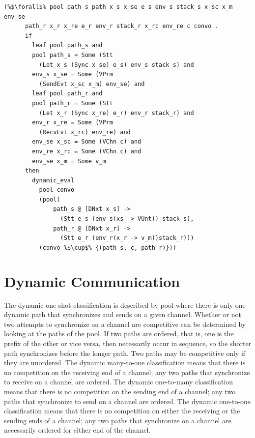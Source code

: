 \documentclass{article}
\begin{document}
\begin{lstlisting}[language=logic, escapechar=\%]
    (%$\forall$% pool path_s path x_s x_se e_s env_s stack_s x_sc x_m env_se
      path_r x_r x_re e_r env_r stack_r x_rc env_re c convo .
      if 
        leaf pool path_s and
        pool path_s = Some (Stt
          (Let x_s (Sync x_se) e_s) env_s stack_s) and
        env_s x_se = Some (VPrm
          (SendEvt x_sc x_m) env_se) and
        leaf pool path_r and
        pool path_r = Some (Stt
          (Let x_r (Sync x_re) e_r) env_r stack_r) and
        env_r x_re = Some (VPrm
          (RecvEvt x_rc) env_re) and
        env_se x_sc = Some (VChn c) and
        env_re x_rc = Some (VChn c) and 
        env_se x_m = Some v_m
      then
        dynamic_eval
          pool convo
          (pool(
              path_s @ [DNxt x_s] ->
                (Stt e_s (env_s(xs -> VUnt)) stack_s), 
              path_r @ [DNxt x_r] ->
                (Stt e_r (env_r(x_r -> v_m))stack_r))) 
          (convo %$\cup$% {(path_s, c, path_r)}))
  \end{lstlisting}

\section{Dynamic Communication}

The dynamic one shot classification is described by pool where there is only one dynamic path
that synchronizes and sends on a given channel. Whether or not two attempts to
synchronize on a channel are competitive can be determined by
looking at the paths of the pool. If two paths are ordered, that is, one is the
prefix of the other or vice versa, then necessarily
occur in sequence, so the shorter path synchronizes before the longer path. Two paths may
be competitive only if they are unordered. The dynamic many-to-one classification means that
there is no competition on the receiving end of a channel; any two paths that synchronize to
receive on a channel are ordered. The dynamic one-to-many classification means that there
is no competition on the sending end of a channel; any two paths that synchronize to
send on a channel are ordered. The dynamic one-to-one classification means that there is no
competition on either the receiving or the sending ends of a channel; any two paths that
synchronize on a channel are necessarily ordered for either end of the channel. 
\end{document}
